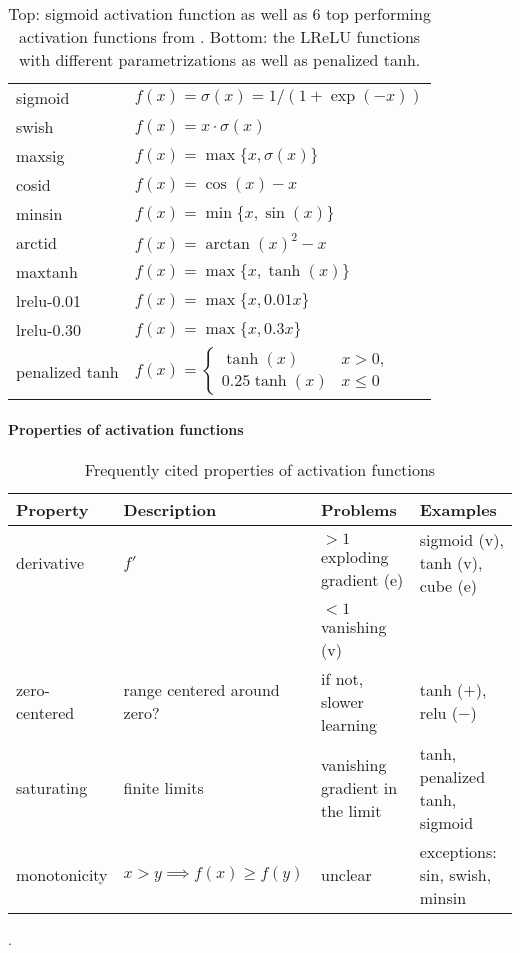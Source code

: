 \documentclass[11pt,a4paper]{article}
\newcommand{\relu}{\textsf{relu}}
\newcommand{\lrelua}{\textsf{lrelu-0.01}}
\newcommand{\lrelub}{\textsf{lrelu-0.30}}
\newcommand{\swish}{\textsf{swish}}
\newcommand{\pentan}{\textsf{penalized tanh}}
\newcommand{\arctid}{\textsf{arctid}}
\newcommand{\minsin}{\textsf{minsin}}
\newcommand{\maxtanh}{\textsf{maxtanh}}
\newcommand{\mytanh}{\textsf{tanh}}
\newcommand{\mysin}{\textsf{sin}}
\newcommand{\maxsig}{\textsf{maxsig}}
\newcommand{\sigmoid}{\textsf{sigmoid}}
\newcommand{\cosid}{\textsf{cosid}}
\newcommand{\cube}{\textsf{cube}}
\begin{document}
\begin{table}[!htb]
  \centering
  \begin{tabular}{ll}
  \toprule
    \sigmoid & $f(x)=\sigma(x)=1/(1+\exp(-x))$\\
    \swish & $f(x)=x\cdot \sigma(x)$\\
    \maxsig & $f(x)=\max\{x,\sigma(x)\}$\\
    \cosid & $f(x)=\cos(x)-x$\\
    \minsin & $f(x)=\min\{x,\sin(x)\}$\\
    \arctid & $f(x)=\arctan(x)^2-x$\\
    \maxtanh & $f(x)=\max\{x,\tanh(x)\}$\\
    \midrule
    \lrelua & $f(x)=\max\{x,0.01x\}$ \\
    \lrelub & $f(x)=\max\{x,0.3x\}$ \\
    {\small \pentan} & $f(x)=\begin{cases}\tanh(x) & x>0,\\ 0.25\tanh(x) & x\le 0\end{cases}$\\
    \bottomrule
  \end{tabular}
  \caption{Top: \sigmoid{} activation function as well as 6 top performing activation functions from \citet{Ramach:2018}. Bottom: the LReLU functions with different parametrizations as well as \pentan{}.}
  \label{table:functions}
\end{table}

\paragraph{Properties of activation functions}

\begin{table*}[!htb]
\centering
\footnotesize
\begin{tabular}{llll}
  \toprule
  Property & Description & Problems & Examples \\ \midrule
  derivative & $f'$ & $>1$ exploding gradient (e) &  \sigmoid{} (v), \mytanh{} (v), \cube{} (e)\\
  & & $<1$ vanishing (v) & \\
  zero-centered & range centered around zero? &   if not, slower learning & \mytanh{} ($+$), \relu{} ($-$) \\
  saturating & finite limits & vanishing gradient in the limit & \mytanh{}, \pentan{}, \sigmoid{}\\
  monotonicity & $x>y\implies f(x)\ge f(y)$ & unclear & exceptions: \mysin{}, \swish{}, \minsin{}
  \\ \bottomrule
 \end{tabular}
 \caption{Frequently cited properties of activation functions}.
 \label{table:properties}
\end{table*}
\end{document}
